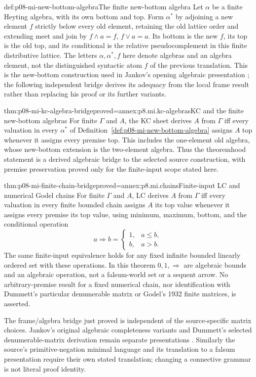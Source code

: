 \begin{hbdefinition}{def:p08-mi-new-bottom-algebra}{The finite new-bottom algebra}
Let \(\alpha\) be a finite Heyting algebra, with its own bottom and
top. Form \(\alpha^*\) by adjoining a new element \(f\) strictly
below every old element, retaining the old lattice order and extending
meet and join by \(f\wedge a=f\), \(f\vee a=a\).
Its bottom is the new \(f\), its top is the old top, and its conditional
is the relative pseudocomplement in this finite distributive lattice.
The letters \(\alpha,\alpha^*,f\) here denote algebras and an algebra
element, not the distinguished syntactic atom \(f\) of the previous
translation. This is the new-bottom construction used in Jankov's
opening algebraic presentation \cite[pp.~997--999]{Jankov1968WeakExcludedMiddle};
the following independent bridge derives its adequacy from the local
frame result rather than replacing his proof or its further variants.
\end{hbdefinition}

\begin{hbtheorem}{thm:p08-mi-kc-algebra-bridge}{proved=annex:p8.mi.kc-algebras}{KC and the finite new-bottom algebras}
For finite \(\Gamma\) and \(A\), the KC sheet derives \(A\) from
\(\Gamma\) iff every valuation in every \(\alpha^*\) of
Definition~\ref{def:p08-mi-new-bottom-algebra} assigns \(A\) top
whenever it assigns every premise top. This includes the one-element
old algebra, whose new-bottom extension is the two-element algebra.
Thus the theoremhood statement is a derived algebraic bridge to the
selected source construction, with premise preservation proved only
for the finite-input scope stated here.
\end{hbtheorem}

\begin{hbtheorem}{thm:p08-mi-finite-chain-bridge}{proved=annex:p8.mi.chains}{Finite-input LC and numerical Godel chains}
For finite \(\Gamma\) and \(A\), LC derives \(A\) from \(\Gamma\)
iff every valuation in every finite bounded chain assigns \(A\) its top
value whenever it assigns every premise its top value, using minimum,
maximum, bottom, and the conditional operation
\[
 a\Rightarrow b=\begin{cases}1,&a\leq b,\\ b,&a>b.\end{cases}
\]
The same finite-input equivalence holds for any fixed infinite bounded
linearly ordered set with these operations. In this theorem
\(0,1,\Rightarrow\) are algebraic bounds and an algebraic operation,
not a falsum-world set or a sequent arrow. No arbitrary-premise result
for a fixed numerical chain, nor identification with Dummett's particular
denumerable matrix or Godel's 1932 finite matrices, is asserted.
\end{hbtheorem}

The frame/algebra bridge just proved is independent of the source-specific
matrix choices. Jankov's original algebraic completeness variants and
Dummett's selected denumerable-matrix derivation remain separate
presentations \cite{Jankov1968WeakExcludedMiddle,Dummett1959}.
Similarly the source's primitive-negation minimal language and its
translation to a falsum presentation require their own stated translation;
changing a connective grammar is not literal proof identity.
